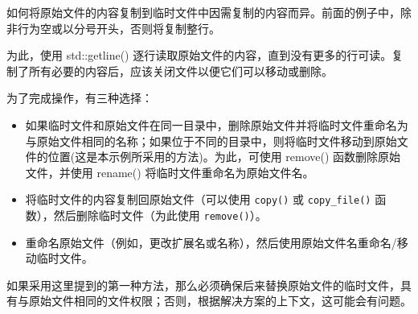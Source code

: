如何将原始文件的内容复制到临时文件中因需复制的内容而异。前面的例子中，除非行为空或以分号开头，否则将复制整行。

为此，使用 std::getline() 逐行读取原始文件的内容，直到没有更多的行可读。复制了所有必要的内容后，应该关闭文件以便它们可以移动或删除。

为了完成操作，有三种选择：

\begin{itemize}
\item
如果临时文件和原始文件在同一目录中，删除原始文件并将临时文件重命名为与原始文件相同的名称；如果位于不同的目录中，则将临时文件移动到原始文件的位置(这是本示例所采用的方法)。为此，可使用 remove() 函数删除原始文件，并使用 rename() 将临时文件重命名为原始文件名。

\item
将临时文件的内容复制回原始文件（可以使用 \verb|copy()| 或 \verb|copy_file()| 函数），然后删除临时文件（为此使用 \verb|remove()|）。

\item
重命名原始文件（例如，更改扩展名或名称），然后使用原始文件名重命名/移动临时文件。
\end{itemize}

\begin{myTip}
如果采用这里提到的第一种方法，那么必须确保后来替换原始文件的临时文件，具有与原始文件相同的文件权限；否则，根据解决方案的上下文，这可能会有问题。
\end{myTip}

